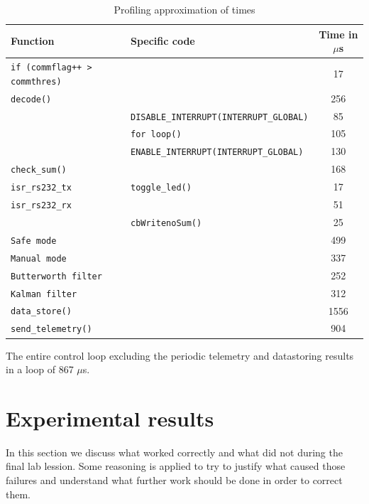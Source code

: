 \documentclass{article}
\begin{document}
\begin{table}[ht]
\centering
\begin{tabular}{|l|l|c|}
\hline 
\textbf{Function} & \textbf{Specific code} & \textbf{Time in $\mu$s} \\ 
\hline 
\texttt{if (commflag++ > commthres)} & & 17 \\
\hline
\texttt{decode()} & & 256 \\
\hline
 & \texttt{DISABLE\_INTERRUPT(INTERRUPT\_GLOBAL)} & 85 \\
 & \texttt{for loop()} & 105 \\
 & \texttt{ENABLE\_INTERRUPT(INTERRUPT\_GLOBAL)} & 130 \\
\hline
\texttt{check\_sum()} & & 168 \\
\hline
\texttt{isr\_rs232\_tx} & \texttt{toggle\_led()} & 17 \\
\hline
\texttt{isr\_rs232\_rx} & & 51 \\
\hline
 & \texttt{cbWritenoSum()} & 25 \\
\hline
\texttt{Safe mode} & & 499 \\
\hline
\texttt{Manual mode} & & 337 \\
\hline 
\texttt{Butterworth filter} & & 252 \\
\hline
\texttt{Kalman filter} & & 312 \\
\hline
\texttt{data\_store()} & & 1556 \\
\hline
\texttt{send\_telemetry()} & & 904 \\
\hline
\end{tabular} 
\caption{Profiling approximation of times}
\label{tbl:profiling}
\end{table}

The entire control loop excluding the periodic telemetry and datastoring results in a loop of 867 $\mu$s. 


\section{Experimental results}
\label{sec:results}
In this section we discuss what worked correctly and what did not during the final lab lession. Some reasoning is applied to try to justify what caused those failures and understand what further work should be done in order to correct them.
\end{document}
